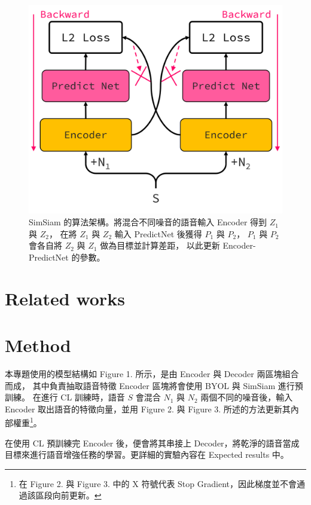 \documentclass[10pt,twocolumn,letterpaper]{article}
\begin{document}
\begin{CJK}{UTF8}{bkai}
   \begin{figure}[t]
      \begin{center}
         \includegraphics[width=1\linewidth]{img/SimSiam.png}
      \end{center}
      \caption{SimSiam 的算法架構。將混合不同噪音的語音輸入 Encoder 得到 $Z_1$ 與 $Z_2$，
         在將 $Z_1$ 與 $Z_2$ 輸入 PredictNet 後獲得 $P_1$ 與 $P_2$，
         $P_1$ 與 $P_2$ 會各自將 $Z_2$ 與 $Z_1$ 做為目標並計算差距，
         以此更新 Encoder-PredictNet 的參數。\label{fig:SimSiam}}
   \end{figure}
   \section{Related works}
   \section{Method}
   本專題使用的模型結構如 Figure 1. 所示，是由 Encoder 與 Decoder 兩區塊組合而成，
   其中負責抽取語音特徵 Encoder 區塊將會使用 BYOL 與 SimSiam 進行預訓練。
   在進行 CL 訓練時，語音 $S$ 會混合 $N_1$ 與 $N_2$ 兩個不同的噪音後，輸入 Encoder
   取出語音的特徵向量，並用 Figure 2. 與 Figure 3. 所述的方法更新其內部權重\footnote{在
      Figure 2. 與 Figure 3. 中的 X 符號代表 Stop Gradient，因此梯度並不會通過該區段向前更新。}。

   在使用 CL 預訓練完 Encoder 後，便會將其串接上
   Decoder，將乾淨的語音當成目標來進行語音增強任務的學習。更詳細的實驗內容在 Expected results 中。



\end{CJK}
\end{document}
